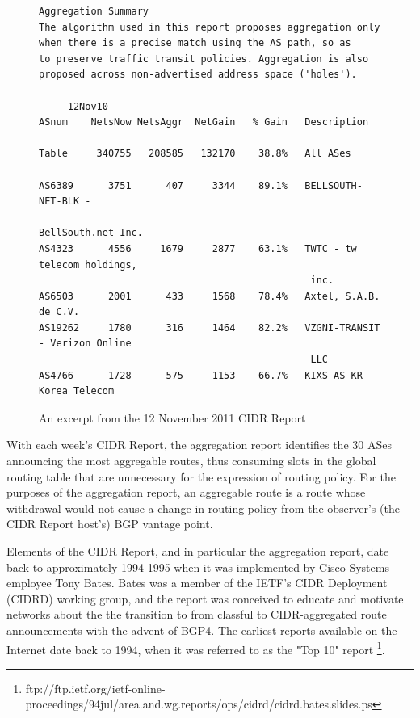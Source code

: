 \begin{figure}
\begin{lstlisting}[frame=trlb]
Aggregation Summary
The algorithm used in this report proposes aggregation only
when there is a precise match using the AS path, so as 
to preserve traffic transit policies. Aggregation is also
proposed across non-advertised address space ('holes').

 --- 12Nov10 ---
ASnum    NetsNow NetsAggr  NetGain   % Gain   Description

Table     340755   208585   132170    38.8%   All ASes

AS6389      3751      407     3344    89.1%   BELLSOUTH-NET-BLK -
                                               BellSouth.net Inc.
AS4323      4556     1679     2877    63.1%   TWTC - tw telecom holdings,
                                               inc.
AS6503      2001      433     1568    78.4%   Axtel, S.A.B. de C.V.
AS19262     1780      316     1464    82.2%   VZGNI-TRANSIT - Verizon Online
                                               LLC
AS4766      1728      575     1153    66.7%   KIXS-AS-KR Korea Telecom
\end{lstlisting}
\caption{An excerpt from the 12 November 2011 CIDR Report}
\label{fig:ex_cidr_report}
\end{figure}

With each week's CIDR Report, the aggregation report identifies the 30 ASes announcing the most aggregable routes, thus consuming slots in the global routing table that are unnecessary for the expression of routing policy. For the purposes of the aggregation report, an aggregable route is a route whose withdrawal would not cause a change in routing policy from the observer's (the CIDR Report host's) BGP vantage point.

Elements of the CIDR Report, and in particular the aggregation report, date back to approximately 1994-1995 when it was implemented by Cisco Systems employee Tony Bates. Bates was a member of the IETF's CIDR Deployment (CIDRD) working group, and the report was conceived to educate and motivate networks about the the transition to from classful to CIDR-aggregated route announcements with the advent of BGP4. The earliest reports available on the Internet date back to 1994, when it was referred to as the "Top 10" report \footnote{ftp://ftp.ietf.org/ietf-online-proceedings/94jul/area.and.wg.reports/ops/cidrd/cidrd.bates.slides.ps}.

